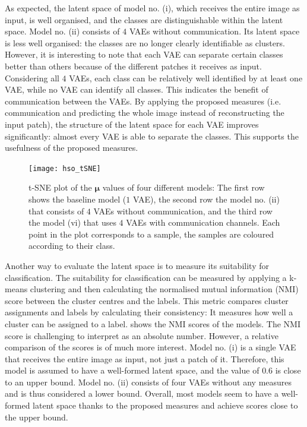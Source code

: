 As expected, the latent space of model no. (i), which receives the entire image as input, is well organised, and the classes are distinguishable within the latent space. Model no. (ii) consists of $4$ VAEs without communication. Its latent space is less well organised: the classes are no longer clearly identifiable as clusters. However, it is interesting to note that each VAE can separate certain classes better than others because of the different patches it receives as input. Considering all $4$ VAEs, each class can be relatively well identified by at least one VAE, while no VAE can identify all classes. This indicates the benefit of communication between the VAEs.
By applying the proposed measures (i.e. communication and predicting the whole image instead of reconstructing the input patch), the structure of the latent space for each VAE improves significantly: almost every VAE is able to separate the classes. This supports the usefulness of the proposed measures.

\begin{figure}[h]
    \centering
    \texttt{[image: hso\_tSNE]}
    \caption[t-SNE plot of the $\boldsymbol{\mu}$ values of different models]{t-SNE plot of the $\boldsymbol{\mu}$ values of four different models: The first row shows the baseline model ($1$ VAE), the second row the model no. (ii) that consists of $4$ VAEs without communication, and the third row the model (vi) that uses $4$ VAEs with communication channels. Each point in the plot corresponds to a sample, the samples are coloured according to their class.}
\end{figure}


Another way to evaluate the latent space is to measure its suitability for classification. The suitability for classification can be measured by applying a k-means clustering and then calculating the normalised mutual information (NMI) score between the cluster centres and the labels. This metric compares cluster assignments and labels by calculating their consistency: It measures how well a cluster can be assigned to a label.  shows the NMI scores of the models.
The NMI score is challenging to interpret as an absolute number. However, a relative comparison of the scores is of much more interest. Model no. (i) is a single VAE that receives the entire image as input, not just a patch of it. Therefore, this model is assumed to have a well-formed latent space, and the value of $0.6$ is close to an upper bound. Model no. (ii) consists of four VAEs without any measures and is thus considered a lower bound. Overall, most models seem to have a well-formed latent space thanks to the proposed measures and achieve scores close to the upper bound.

